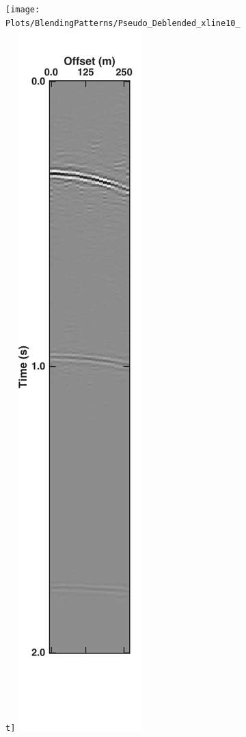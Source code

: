 \begin{figure}
\begin{subfigure}[t]{0.26\textwidth}
		\caption{}
		\label{fig:Ch-Results-Debl-inline10-x}
	\end{subfigure}
	\centering
	\begin{subfigure}[t]{0.26\textwidth}
		\centering
		\texttt{[image: Plots/BlendingPatterns/Pseudo\_Deblended\_xline10\_t]}
		\includegraphics[height = 0.38\textheight]{Plots/BlendingPatterns/Deblended_xline10t}

\end{subfigure}
\end{figure}
